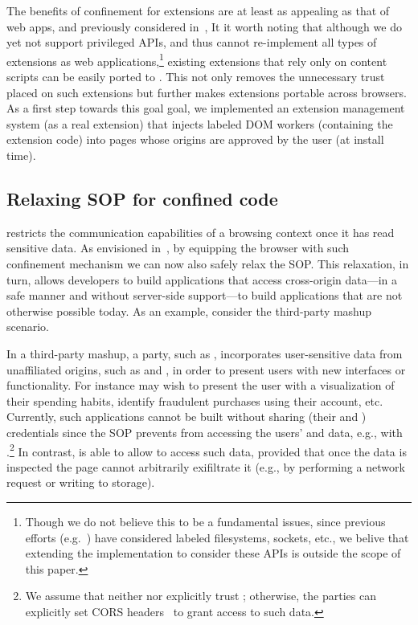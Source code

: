 The benefits of confinement for extensions are at least as appealing
as that of web apps, and previously considered in~\tocite{},
%
It it worth noting that although we do yet not support privileged
APIs, and thus cannot re-implement all types of extensions as web
applications,\footnote{
  Though we do not believe this to be a fundamental issues, since
  previous efforts (e.g.~\cite{flume}) have considered labeled
  filesystems, sockets, etc., we belive that extending the
  implementation to consider these APIs is outside the scope of this
  paper.
}
existing extensions that rely only on content scripts can be easily
ported to \sys{}.
%
This not only removes the unnecessary trust placed on such extensions
but further makes extensions portable across browsers.
% 
As a first step towards this goal goal, we implemented an extension
management system (as a real extension) that injects labeled DOM
workers (containing the extension code) into pages whose origins are
approved by the user (at install time).
%


\subsection{Relaxing SOP for confined code}
\label{sec:system:mashup}
%
\sys{} restricts the communication capabilities of a browsing context
once it has read sensitive data.
%
As envisioned in~\cite{yang:2013:towards}, by equipping the browser with such
confinement mechanism we can now also safely relax the SOP.
%
This relaxation, in turn, allows developers to build applications that access
cross-origin data---in a safe manner and without server-side support---to build
applications that are not otherwise possible today.
%
As an example, consider the third-party mashup scenario.

In a third-party mashup, a party, such as ,
incorporates user-sensitive data from unaffiliated origins, such as
 and , in order to present users with new
interfaces or functionality.
%
For instance  may wish to present the user with a
visualization of their spending habits, identify fraudulent
 purchases using their  account, etc.
%
Currently, such applications cannot be built without sharing (their
 and ) credentials since the SOP
prevents  from accessing the users' 
and  data, e.g., with \xhr{}.\footnote{
 We assume that neither  nor 
 explicitly trust ; otherwise, the parties can
 explicitly set CORS headers~\cite{cors13} to grant 
 access to such data.
}
%
In contrast, \sys{} is able to allow  to access such
data, provided that once the data is inspected the page cannot
arbitrarily exifiltrate it (e.g., by performing a network request or
writing to storage).
 
